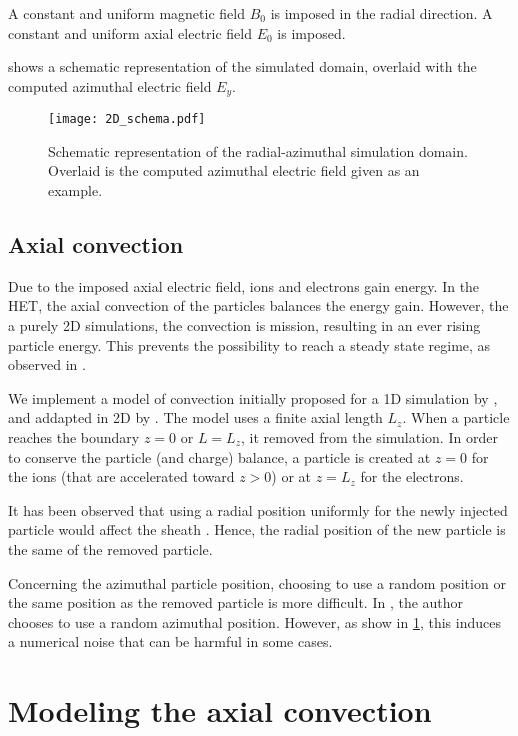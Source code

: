 A constant and uniform magnetic field $B_0$ is imposed in the radial direction.
A constant and uniform axial electric field $E_0$ is imposed.

 shows a schematic representation of the simulated domain, overlaid with the computed azimuthal electric field $E_y$.

\begin{figure}[hbtp]
  \centering
  \texttt{[image: 2D\_schema.pdf]}
  \caption{Schematic representation of the radial-azimuthal simulation domain. Overlaid is the computed azimuthal electric field given as an example. }
  \label{fig-2dschemat}
\end{figure}

\subsection{Axial convection}

Due to the imposed axial electric field, ions and electrons gain energy.
In the \ac{HET}, the axial convection of the particles balances the energy gain.
However, the a purely \ac{2D} simulations, the convection is mission, resulting in an ever rising particle energy.
This prevents the possibility to reach a steady state regime, as observed in \citet{heron2013,janhunen2018}.

We implement a model of convection initially proposed for a \ac{1D} simulation by \citet{lafleur2016a}, and addapted in \ac{2D} by \citet{croes2017a}.
The model uses a finite axial length $L_z$.
When a particle reaches the boundary $z=0$ or $L=L_z$, it removed from the simulation.
In order to conserve the particle (and charge) balance, a particle is created at $z=0$ for the ions (that are accelerated toward $z>0$) or at $z=L_z$ for the electrons.

It has been observed that using a radial position uniformly for the newly injected particle would affect the sheath \citep{croes2017a}.
Hence, the radial position of the new particle is the same of the removed particle.

Concerning the azimuthal particle position, choosing to use a random position or the same position as the removed particle is more difficult.
In \citet{lafleur2016a,croes2017a}, the author chooses to use a random azimuthal position.
However, as show in \cref{sec-reinjectionnoise}, this induces a numerical noise that can be harmful in some cases.

\section{Modeling the axial convection }
  \label{sec-reinjectionnoise}
